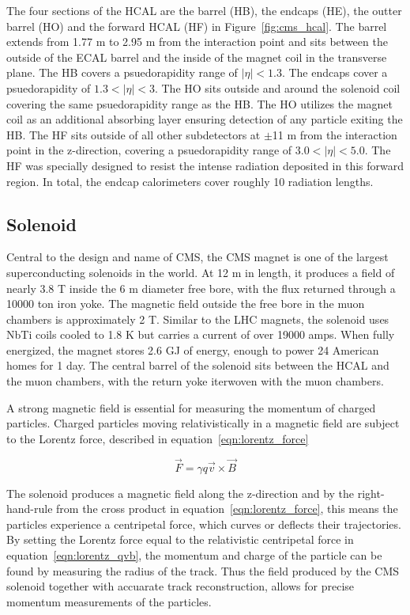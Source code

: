 The four sections of the HCAL are the barrel (HB), the endcaps (HE), the outter barrel (HO) and the forward HCAL (HF) in Figure~\ref{fig:cms_hcal}. The barrel extends from 1.77 m to 2.95 m from the interaction point and
sits between the outside of the ECAL barrel and the inside of the magnet coil in the transverse plane. The HB covers a psuedorapidity range of $|\eta| < 1.3$.
The endcaps cover a psuedorapidity of $1.3 < |\eta| < 3$. The HO sits outside and around the solenoid coil covering the same psuedorapidity range
as the HB. The HO utilizes the magnet coil as an additional absorbing layer ensuring detection of any particle exiting the HB. The HF sits outside of all other subdetectors at $\pm$11 m from the interaction point in the z-direction,
covering a psuedorapidity range of $3.0 < |\eta| < 5.0$. The HF was specially designed to resist the intense radiation deposited in this forward region. In total, the endcap calorimeters cover roughly 10 radiation lengths.

\subsection{Solenoid}
Central to the design and name of CMS, the CMS magnet is one of the largest superconducting solenoids in the world.
At 12 m in length, it produces a field of nearly 3.8 T inside the 6 m diameter free bore, with the flux returned through a 10000 ton iron yoke.
The magnetic field outside the free bore in the muon chambers is approximately 2 T.  
Similar to the LHC magnets, the solenoid uses NbTi coils cooled to 1.8 K but carries a current of over 19000 amps. When fully energized, the magnet
stores 2.6 GJ of energy, enough to power 24 American homes for 1 day\cite{magnet_energy}. The central barrel of the solenoid sits between the HCAL and the muon chambers, with the return yoke iterwoven with the muon chambers.

A strong magnetic field is essential for measuring the momentum of charged particles. Charged particles moving relativistically in a magnetic field are subject to the Lorentz force, described in
equation~\ref{eqn:lorentz_force} 

\begin{equation}
\label{eqn:lorentz_force}
 \vec{F} = \gamma q\vec{v} \times \vec{B}
\end{equation}

The solenoid produces a magnetic field along the z-direction and by the right-hand-rule from the cross product in equation~\ref{eqn:lorentz_force}, this means the particles experience a centripetal force, which
curves or deflects their trajectories. By setting the Lorentz force equal to the relativistic centripetal force in equation~\ref{eqn:lorentz_qvb}, the momentum and charge of the particle can be found by measuring the radius of the track. 
Thus the field produced by the CMS solenoid together with accuarate track reconstruction, allows for precise momentum measurements of the particles.

